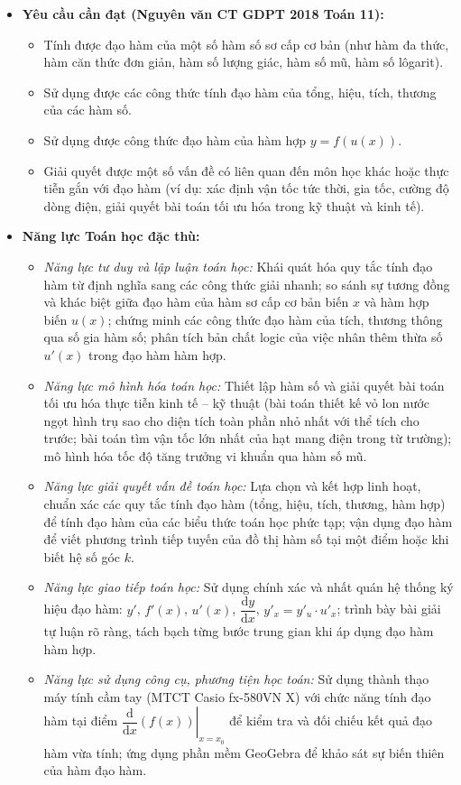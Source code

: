\documentclass[12pt, a4paper]{article}
\begin{document}
\begin{itemize}[leftmargin=1.2cm]
    \item \textbf{Yêu cầu cần đạt (Nguyên văn CT GDPT 2018 Toán 11):}
    \begin{itemize}[leftmargin=0.6cm]
        \item Tính được đạo hàm của một số hàm số sơ cấp cơ bản (như hàm đa thức, hàm căn thức đơn giản, hàm số lượng giác, hàm số mũ, hàm số lôgarit).
        \item Sử dụng được các công thức tính đạo hàm của tổng, hiệu, tích, thương của các hàm số.
        \item Sử dụng được công thức đạo hàm của hàm hợp $y = f(u(x))$.
        \item Giải quyết được một số vấn đề có liên quan đến môn học khác hoặc thực tiễn gắn với đạo hàm (ví dụ: xác định vận tốc tức thời, gia tốc, cường độ dòng điện, giải quyết bài toán tối ưu hóa trong kỹ thuật và kinh tế).
    \end{itemize}

    \item \textbf{Năng lực Toán học đặc thù:}
    \begin{itemize}[leftmargin=0.6cm]
        \item \textit{Năng lực tư duy và lập luận toán học:} Khái quát hóa quy tắc tính đạo hàm từ định nghĩa sang các công thức giải nhanh; so sánh sự tương đồng và khác biệt giữa đạo hàm của hàm sơ cấp cơ bản biến $x$ và hàm hợp biến $u(x)$; chứng minh các công thức đạo hàm của tích, thương thông qua số gia hàm số; phân tích bản chất logic của việc nhân thêm thừa số $u'(x)$ trong đạo hàm hàm hợp.
        \item \textit{Năng lực mô hình hóa toán học:} Thiết lập hàm số và giải quyết bài toán tối ưu hóa thực tiễn kinh tế -- kỹ thuật (bài toán thiết kế vỏ lon nước ngọt hình trụ sao cho diện tích toàn phần nhỏ nhất với thể tích cho trước; bài toán tìm vận tốc lớn nhất của hạt mang điện trong từ trường); mô hình hóa tốc độ tăng trưởng vi khuẩn qua hàm số mũ.
        \item \textit{Năng lực giải quyết vấn đề toán học:} Lựa chọn và kết hợp linh hoạt, chuẩn xác các quy tắc tính đạo hàm (tổng, hiệu, tích, thương, hàm hợp) để tính đạo hàm của các biểu thức toán học phức tạp; vận dụng đạo hàm để viết phương trình tiếp tuyến của đồ thị hàm số tại một điểm hoặc khi biết hệ số góc $k$.
        \item \textit{Năng lực giao tiếp toán học:} Sử dụng chính xác và nhất quán hệ thống ký hiệu đạo hàm: $y'$, $f'(x)$, $u'(x)$, $\dfrac{\mathrm{d}y}{\mathrm{d}x}$, $y'_x = y'_u \cdot u'_x$; trình bày bài giải tự luận rõ ràng, tách bạch từng bước trung gian khi áp dụng đạo hàm hàm hợp.
        \item \textit{Năng lực sử dụng công cụ, phương tiện học toán:} Sử dụng thành thạo máy tính cầm tay (MTCT Casio fx-580VN X) với chức năng tính đạo hàm tại điểm $\left. \dfrac{\mathrm{d}}{\mathrm{d}x} (f(x)) \right|_{x = x_0}$ để kiểm tra và đối chiếu kết quả đạo hàm vừa tính; ứng dụng phần mềm GeoGebra để khảo sát sự biến thiên của hàm đạo hàm.
    \end{itemize}


\end{itemize}
\end{document}
